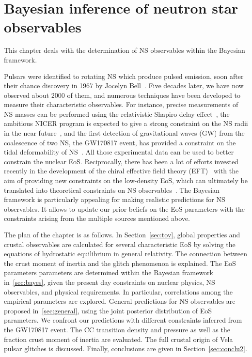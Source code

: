 %

\chapter{Bayesian inference of neutron star observables}

This chapter deals with the determination of NS observables within the Bayesian 
framework.

Pulsars were identified to rotating NS which produce pulsed emission, soon 
after their chance discovery in 1967 by Jocelyn Bell~\cite{Hewish1968}. Five
decades later, we have now observed about 2000 of them, and numerous techniques
have been developed to measure their characteristic observables. For instance, 
precise measurements of NS masses can be performed using the relativistic 
Shapiro delay effect~\cite{Demorest2010,Antoniadis2013,Cromartie2020}, the
ambitious NICER program is expected to give a strong constraint on the NS radii 
in the near future~\cite{NICER}, and the first detection of gravitational waves
(GW) from the coalescence of two NS, the GW170817 event, has provided a
constraint on the tidal deformability of NS~\cite{GWtidal,GW1,GW2}. All those
experimental data can be used to better constrain the nuclear EoS. 
Reciprocally, there has been a lot of efforts invested recently in the 
development of the chiral effective field theory (EFT)~\cite{Drischler2016} 
with the aim of providing new constraints on the low-density EoS, which can
ultimately be translated into theoretical constraints on NS
observables~\cite{Carreau2019cc,Carreau2019moi}.
The Bayesian framework is particularly appealing for making realistic 
predictions for NS observables. It allows to update our prior beliefs on the 
EoS parameters with the constraints arising from the multiple sources mentioned 
above.

The plan of the chapter is as follows. In Section~\ref{sec:tov}, global
properties and crustal observables are calculated for several characteristic 
EoS by solving the equations of hydrostatic equilibrium in general relativity.
The connection between the crust moment of inertia and the glitch phenomenon is
explained. The EoS parameters parameters are determined within the 
Bayesian framework in~\ref{sec:bayes}, given the present day constraints on
nuclear physics, NS observables, and physical requirements. In particular,
correlations among the empirical parameters are explored. General predictions
for NS observables are proposed in~\ref{sec:general}, using the joint posterior
distribution of EoS parameters. We confront our predictions with different 
constraints inferred from the GW170817 event. The CC transition density and
pressure as well as the fraction crust moment of inertia are evaluated. The
full crustal origin of Vela pulsar glitches is discussed. Finally, conclusions 
are given in Section~\ref{sec:conclu2}.

